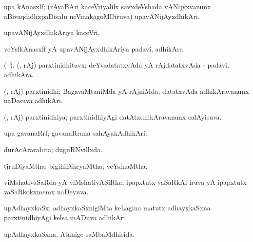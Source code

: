 {{{{{\bentry
{} 
\gl{\nA}
\expl{}
\bmng
 upa kAnasxlf; (rAyaBAri kaceVriyalilx savxdeVshada vANijyxvanunx aBivaqdidhxpaDisalu neVmakagoMDiruva) upavANijAyxdhikAri. 
\emng
\eentry

\bentry
{} 
\gl{\nA}
\expl{}
\bmng
 upavANijAyxdhikAriya kaceVri. 
\emng
\eentry

\bentry
{} 
\gl{\nA}
\expl{}
\bmng
 veYsfkAnasxlf yA upavANijAyxdhikAriya padavi, adhikAra. 
\emng
\eentry

\bentry
{} 
\gl{\nA}(\bava\ ). 
\bmng
 (\deVva, rAj) parxtinidhitavx; deYvadatatxvAda yA rAjdatatxvAda - padavi, adhikAra. 
\emng
\eentry

\bentry
{} 
\gl{\nA}
\expl{}
\bmng
 (\deVva, rAj) parxtinidhi; BagavaMtaniMda yA rAjniMda, datatxvAda adhikAravanunx naDesuva adhikAri. 
\emng
\eentry

\bentry
{} 
\gl{\gu}
\expl{}
\bmng
 (\deVva, rAj) parxtinidhiya; parxtinidhiyAgi datAtxdhikAravanunx calAyisuva. 
\emng
\eentry

\bentry
{} 
\gl{\nA}
\expl{}
\bmng
 upa gavanaRrf; gavanaRrana sahAyakAdhikAri. 
\emng
\eentry

\bentry
{} 
\gl{\gu}
\expl{}
\bmng
 durAcArarahita; duguRNvillxda. 
\emng
\eentry

\bentry
{} 
\gl{\gu}
\expl{}
\bmng
 tiruDiyaMtha; bigihiDikeyaMtha; veYsfnaMtha. 
\emng
\eentry

\bentry
{} 
\gl{\gu}
\expl{}
\bmng
 viMshativaSaRda yA viMshativASiRka; ipapxtutx vaSaRkAl iruva yA ipapxtutx vaSaRkokxmemx naDeyuva. 
\emng
\eentry

\bentry
{} 
\gl{\nA}
\expl{}
\bmng
\emng
\eentry

\bentry
{} 
\gl{\nA}
\expl{}
\bmng
 upAdhayxkaSx; adhayxkaSxnigiMta keLagina matutx adhayxkaSxna parxtinidhiyAgi kelsa mADuva adhikAri. 
\emng
\eentry

\bentry
{} 
\gl{\gu}
\expl{}
\bmng
 upAdhayxkaSxna, Atanige saMbaMdhisida. 
\emng
\eentry

}}}}}

